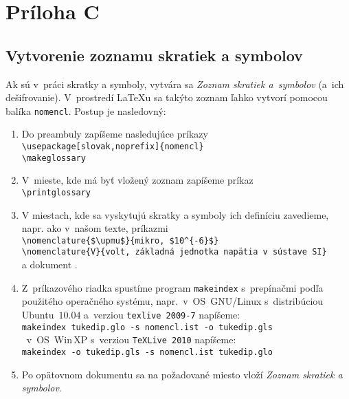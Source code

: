 \section*{Pr\'iloha C}
\subsection*{Vytvorenie zoznamu skratiek a symbolov}

Ak sú v~práci skratky a symboly, vytvára sa \emph{Zoznam skratiek
a~symbolov} (a~ich dešifrovanie). V~prostredí \LaTeX{}u sa takýto
zoznam
ľahko vytvorí pomocou balíka \verb+nomencl+. Postup je nasledovný:
\begin{enumerate}
\item Do preambuly zapíšeme nasledujúce príkazy\\
\verb+\usepackage[slovak,noprefix]{nomencl}+\\ \verb+\makeglossary+
\item  V~mieste, kde má byť\/ vložený zoznam zapíšeme príkaz\\
\verb+\printglossary+
\item V miestach, kde sa vyskytujú skratky a symboly ich definíciu
zavedieme, napr. ako     	v~našom texte, príkazmi\\
\verb+\nomenclature{$\upmu$}{mikro, $10^{-6}$}+\\
\verb+\nomenclature{V}{volt, základná jednotka napätia v sústave SI}+\\
a dokument .
\item Z~príkazového riadka spustíme program \verb+makeindex+
s~prepínačmi podľa použitého operačného systému, napr.~v~OS~GNU/Linux
s~distribúciou Ubuntu~$10.04$ a~verziou \verb+texlive 2009-7+
napíšeme:\\
\verb*+makeindex tukedip.glo -s nomencl.ist -o tukedip.gls+\\
~v~OS~Win\,XP s~verziou \verb+TeXLive 2010+
napíšeme:\\
\verb*+makeindex -o tukedip.gls -s nomencl.ist tukedip.glo+

\item Po opätovnom  dokumentu sa na
požadované
miesto vloží \emph{Zoznam skratiek a symbolov}.
\end{enumerate}
